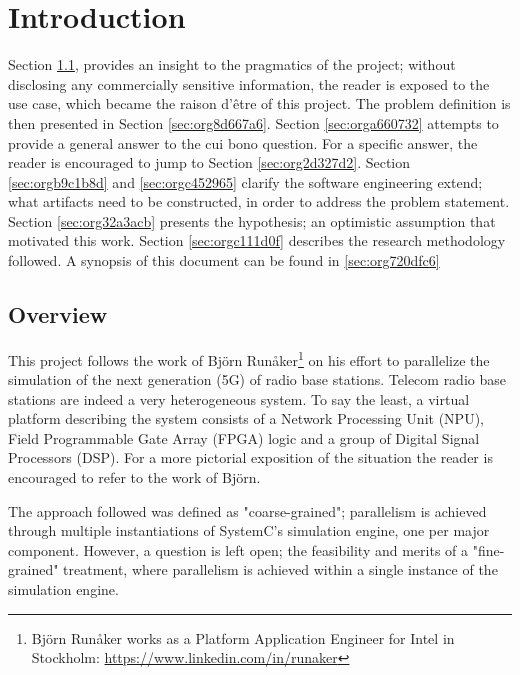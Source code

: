\documentclass[11pt]{article}
\begin{document}
\listoffigures
{}
\clearpage

\section{Introduction}
\label{sec:org4b8fc53}
\pagestyle{scrheadings}

Section \ref{sec:org4cd0b56}, provides an insight to the pragmatics of the project; 
without disclosing any commercially sensitive information, the reader is exposed to the use case, which became the raison d'être of this project.
The problem definition is then presented in Section \ref{sec:org8d667a6}.
Section \ref{sec:orga660732} attempts to provide a general answer to the cui bono question. For a specific answer, the reader is encouraged to jump to Section \ref{sec:org2d327d2}.
Section \ref{sec:orgb9c1b8d} and \ref{sec:orgc452965} clarify the software engineering extend; what artifacts need to be constructed, in order to address the problem statement.
Section \ref{sec:org32a3acb} presents the hypothesis; an optimistic assumption that motivated this work.
Section \ref{sec:orgc111d0f} describes the research methodology followed.
A synopsis of this document can be found in \ref{sec:org720dfc6}

\subsection{Overview}
\label{sec:org4cd0b56}
This project follows the work of Björn Runåker\footnote{Björn Runåker works as a Platform Application Engineer for Intel in Stockholm: \url{https://www.linkedin.com/in/runaker}} \cite{Runaker2015} on his effort to parallelize the simulation of the next generation (5G) of radio base stations.
Telecom radio base stations are indeed a very heterogeneous system.
To say the least, a virtual platform describing the system consists of a Network Processing Unit (NPU), Field Programmable Gate Array (FPGA) logic and a group of Digital Signal Processors (DSP).
For a more pictorial exposition of the situation the reader is encouraged to refer to the work of Björn.

The approach followed was defined as "coarse-grained";
parallelism is achieved through multiple instantiations of SystemC's simulation engine, one per major component.
However, a question is left open;
the feasibility and merits of a "fine-grained" treatment, where parallelism is achieved within a single instance of the simulation engine.
\end{document}
